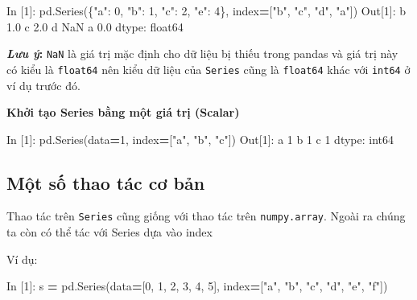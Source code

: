 \documentclass[
]{book}
\makeatletter
\newenvironment{Shaded}{\begin{snugshade}}{\end{snugshade}}
\newcommand{\DecValTok}[1]{\textcolor[rgb]{0.00,0.00,0.81}{#1}}
\newcommand{\FloatTok}[1]{\textcolor[rgb]{0.00,0.00,0.81}{#1}}
\newcommand{\NormalTok}[1]{#1}
\newcommand{\OperatorTok}[1]{\textcolor[rgb]{0.81,0.36,0.00}{\textbf{#1}}}
\newcommand{\StringTok}[1]{\textcolor[rgb]{0.31,0.60,0.02}{#1}}
\newenvironment{kframe}{%
\medskip{}
\setlength{\fboxsep}{.8em}
 \def\at@end@of@kframe{}%
 \ifinner\ifhmode%
  \def\at@end@of@kframe{\end{minipage}}%
  \begin{minipage}{\columnwidth}%
 \fi\fi%
 \def\FrameCommand##1{\hskip\@totalleftmargin \hskip-\fboxsep
 \colorbox{shadecolor}{##1}\hskip-\fboxsep
     \hskip-\linewidth \hskip-\@totalleftmargin \hskip\columnwidth}%
 \MakeFramed {\advance\hsize-\width
   \@totalleftmargin\z@ \linewidth\hsize
   \@setminipage}}%
 {\par\unskip\endMakeFramed%
 \at@end@of@kframe}
\newenvironment{rmdblock}[1]
  {
  \begin{itemize}
  \renewcommand{\labelitemi}{
    \raisebox{-.7\height}[0pt][0pt]{
      {\setkeys{Gin}{width=3em,keepaspectratio}\texttt{[image: images/\#1]}}
    }
  }
  \setlength{\fboxsep}{1em}
  \begin{kframe}
  \item
  }
  {
  \end{kframe}
  \end{itemize}
  }
\newenvironment{rmdnote}
  {\begin{rmdblock}{note}}
  {\end{rmdblock}}
\makeatother
\begin{document}
\begin{Shaded}
\begin{Highlighting}[]
\NormalTok{In [}\DecValTok{1}\NormalTok{]: pd.Series(\{}\StringTok{"a"}\NormalTok{: }\DecValTok{0}\NormalTok{, }\StringTok{"b"}\NormalTok{: }\DecValTok{1}\NormalTok{, }\StringTok{"c"}\NormalTok{: }\DecValTok{2}\NormalTok{, }\StringTok{"e"}\NormalTok{: }\DecValTok{4}\NormalTok{\}, index}\OperatorTok{=}\NormalTok{[}\StringTok{"b"}\NormalTok{, }\StringTok{"c"}\NormalTok{, }\StringTok{"d"}\NormalTok{, }\StringTok{"a"}\NormalTok{])}
\NormalTok{Out[}\DecValTok{1}\NormalTok{]: }
\NormalTok{b    }\FloatTok{1.0}
\NormalTok{c    }\FloatTok{2.0}
\NormalTok{d    NaN}
\NormalTok{a    }\FloatTok{0.0}
\NormalTok{dtype: float64}
\end{Highlighting}
\end{Shaded}

\begin{rmdnote}
\textbf{\emph{Lưu ý}:}
\texttt{NaN} là giá trị mặc định cho dữ liệu bị thiếu trong pandas và giá trị này có kiểu
là \texttt{float64} nên kiểu dữ liệu của \texttt{Series} cũng là \texttt{float64} khác với \texttt{int64} ở ví dụ trước đó.
\end{rmdnote}

\textbf{Khởi tạo Series bằng một giá trị (Scalar)}

\begin{Shaded}
\begin{Highlighting}[]
\NormalTok{In [}\DecValTok{1}\NormalTok{]: pd.Series(data}\OperatorTok{=}\DecValTok{1}\NormalTok{, index}\OperatorTok{=}\NormalTok{[}\StringTok{"a"}\NormalTok{, }\StringTok{"b"}\NormalTok{, }\StringTok{"c"}\NormalTok{])}
\NormalTok{Out[}\DecValTok{1}\NormalTok{]: }
\NormalTok{a    }\DecValTok{1}
\NormalTok{b    }\DecValTok{1}
\NormalTok{c    }\DecValTok{1}
\NormalTok{dtype: int64}
\end{Highlighting}
\end{Shaded}

\subsection{Một số thao tác cơ bản}\label{mux1ed9t-sux1ed1-thao-tuxe1c-cux1a1-bux1ea3n}

Thao tác trên \texttt{Series} cũng giống với thao tác trên \texttt{numpy.array}. Ngoài ra chúng ta còn có thể
tác với Series dựa vào index

Ví dụ:

\begin{Shaded}
\begin{Highlighting}[]
\NormalTok{In [}\DecValTok{1}\NormalTok{]: s }\OperatorTok{=}\NormalTok{ pd.Series(data}\OperatorTok{=}\NormalTok{[}\DecValTok{0}\NormalTok{, }\DecValTok{1}\NormalTok{, }\DecValTok{2}\NormalTok{, }\DecValTok{3}\NormalTok{, }\DecValTok{4}\NormalTok{, }\DecValTok{5}\NormalTok{], index}\OperatorTok{=}\NormalTok{[}\StringTok{"a"}\NormalTok{, }\StringTok{"b"}\NormalTok{, }\StringTok{"c"}\NormalTok{, }\StringTok{"d"}\NormalTok{, }\StringTok{"e"}\NormalTok{, }\StringTok{"f"}\NormalTok{])}
\end{Highlighting}
\end{Shaded}
\end{document}
